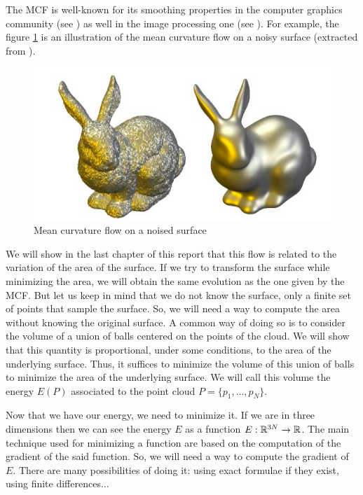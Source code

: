 The MCF is well-known for its smoothing properties in the computer graphics
community (see \cite{desbrun1999implicit}) as well in the image processing one
(see \cite{ciomaga2010level}). For example, the figure
\ref{fig:mean-curvature-flow-ex} is an illustration of the mean curvature flow
on a noisy surface (extracted from \cite{clarenz2000anisotropic}).

\begin{figure}[h]
    \centering
    \includegraphics[scale=0.3]{img/mean-curvature-flow-rabbit}
    \caption{Mean curvature flow on a noised surface}
    \label{fig:mean-curvature-flow-ex}
\end{figure}

We will show in the last chapter of this report that this flow is related to the
variation of the area of the surface. If we try to transform the surface while
minimizing the area, we will obtain the same evolution as the one given by the
MCF. But let us keep in mind that we do not know the surface, only a finite set
of points that sample the surface. So, we will need a way to compute the area
without knowing the original surface. A common way of doing so is to consider
the volume of a union of balls centered on the points of the cloud.  We will
show that this quantity is proportional, under some conditions, to the area of
the underlying surface. Thus, it suffices to minimize the volume of this union
of balls to minimize the area of the underlying surface. We will call this
volume the energy $ E(P) $ associated to the point cloud $ P = \{ p_1, \ldots,
p_N \} $.

Now that we have our energy, we need to minimize it. If we are in
three dimensions then we can see the energy $ E $ as a function $ E : \mathbb{R}^{3N}
\to \mathbb{R} $. The main technique used for minimizing a function are based on the
computation of the gradient of the said function. So, we will need a way to
compute the gradient of $ E $. There are many possibilities of doing it:
using exact formulae if they exist, using finite differences...

